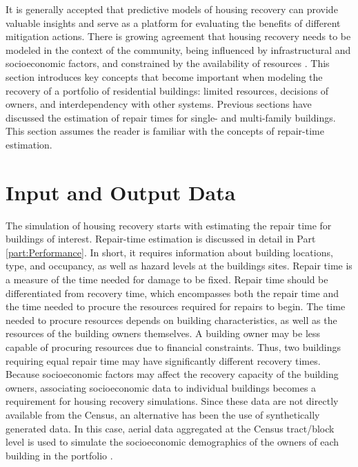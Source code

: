 It is generally accepted that predictive models of housing recovery can provide valuable insights and serve as a platform for evaluating the benefits of different mitigation actions. There is growing agreement that housing recovery needs to be modeled in the context of the community, being influenced by infrastructural and socioeconomic factors, and constrained by the availability of resources \citep{lee2019quantitative, masoomi2018community, ellingwood2018performance, bilau2018practice, Sutley2017a, davidson2015integrating}. This section introduces key concepts that become important when modeling the recovery of a portfolio of residential buildings: limited resources, decisions of owners, and interdependency with other systems. Previous sections have discussed the estimation of repair times for single- and multi-family buildings. This section assumes the reader is familiar with the concepts of repair-time estimation. \ 

\section{Input and Output Data} 
The simulation of housing recovery starts with estimating the repair time for buildings of interest. Repair-time estimation is discussed in detail in Part \ref{part:Performance}. In short, it requires information about building locations, type, and occupancy, as well as hazard levels at the buildings sites. Repair time is a measure of the time needed for damage to be fixed. Repair time should be differentiated from recovery time, which encompasses both the repair time and the time needed to procure the resources required for repairs to begin. The time needed to procure resources depends on building characteristics, as well as the resources of the building owners themselves. A building owner may be less capable of procuring resources due to financial constraints. Thus, two buildings requiring equal repair time may have significantly different recovery times. Because socioeconomic factors may affect the recovery capacity of the building owners, associating socioeconomic data to individual buildings becomes a requirement for housing recovery simulations. Since these data are not directly available from the Census, an alternative has been the use of synthetically generated data. In this case, aerial data aggregated at the Census tract/block level is used to simulate the socioeconomic demographics of the owners of each building in the portfolio \citep{rosenheim2019integration}. \ 

